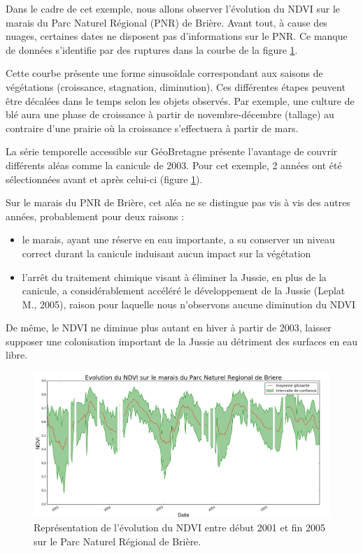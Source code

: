 \documentclass[10pt,a4paper]{article}
\begin{document}
Dans le cadre de cet exemple, nous allons observer l'évolution du NDVI sur le marais du Parc Naturel Régional (PNR) de Brière. Avant tout, à cause des nuages, certaines dates ne disposent pas d'informations sur le PNR. Ce manque de données s'identifie par des ruptures dans la courbe de la figure \ref{TS_NDVI}.\smallbreak

Cette courbe présente une forme sinusoïdale correspondant aux saisons de végétations (croissance, stagnation, diminution). Ces différentes étapes peuvent être décalées dans le temps selon les objets observés. Par exemple, une culture de blé aura une phase de croissance à partir de novembre-décembre (tallage) au contraire d'une prairie où la croissance s'effectuera à partir de mars.\smallbreak

La série temporelle accessible sur GéoBretagne présente l'avantage de couvrir différents aléas comme la canicule de 2003. Pour cet exemple, 2 années ont été sélectionnées avant et après celui-ci (figure \ref{TS_NDVI}).\smallbreak

Sur le marais du PNR de Brière, cet aléa ne se distingue pas vis à vis des autres années, probablement pour deux raisons :
\begin{itemize}
\item le marais, ayant une réserve en eau importante, a su conserver un niveau correct durant la canicule induisant aucun impact sur la végétation
\item l'arrêt du traitement chimique visant à éliminer la Jussie, en plus de la canicule, a considérablement accéléré le développement de la Jussie (Leplat M., 2005), raison pour laquelle nous n'observons aucune diminution du NDVI
\end{itemize}

De même, le NDVI ne diminue plus autant en hiver à partir de 2003, laisser supposer une colonisation important de la Jussie au détriment des surfaces en eau libre.\smallbreak

\begin{figure}[!h]
\centering
\includegraphics[scale=0.29]{img/NDVI_Briere.png}
\caption{Représentation de l'évolution du NDVI entre début 2001 et fin 2005 sur le Parc Naturel Régional de Brière.}
\label{TS_NDVI}
\end{figure}
\end{document}
